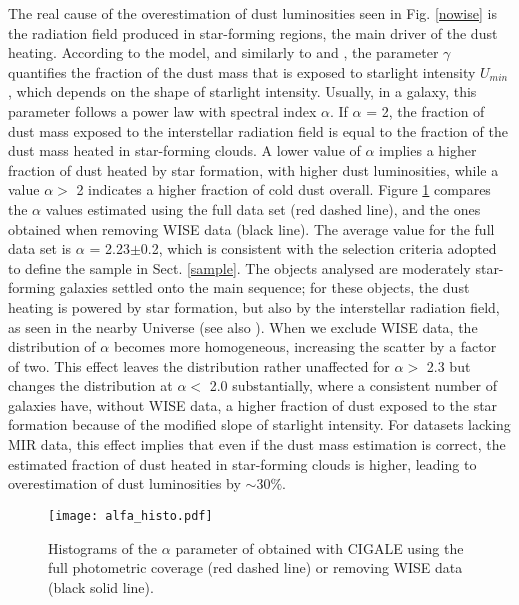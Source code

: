 \documentclass{aa}
\begin{document}
The real cause of the overestimation of dust luminosities  seen in Fig. \ref{nowise} is the radiation field produced in star-forming regions, the main driver of the dust heating. According to the \cite{dra} model, and similarly to \cite{dal} and \cite{dal2}, the parameter $\gamma$ quantifies the fraction of the dust mass that is exposed to starlight intensity $U_{min}$, which depends on the shape of starlight intensity. Usually, in a galaxy, this parameter follows a power law with spectral index $\alpha$. If $\alpha$ = 2, the fraction of dust mass exposed to the interstellar radiation field is equal to the fraction of the dust mass heated in star-forming clouds. A lower value of $\alpha$ implies a higher fraction of dust heated by star formation, with higher dust luminosities, while a value $\alpha >$ 2 indicates a higher fraction of cold dust overall. Figure \ref{alpha} compares the $\alpha$ values estimated using the full data set (red dashed line), and the ones obtained when removing WISE data (black line). The average value for the full data set is $\alpha$ = 2.23$\pm$0.2, which is consistent with the selection criteria adopted to define the sample in Sect. \ref{sample}. The objects analysed are moderately star-forming galaxies settled onto the main sequence; for these objects, the dust heating is powered by star formation, but also by the interstellar radiation field, as seen in the nearby Universe (see also \citealt{lon,ben,ben2,del,ben3,via2,via,boq}). When we exclude WISE data, the distribution of $\alpha$ becomes more homogeneous, increasing the scatter by a factor of two. This effect leaves the distribution rather unaffected for $\alpha >$ 2.3 but changes the distribution at $\alpha <$ 2.0  substantially, where a consistent number of galaxies have, without WISE data, a higher fraction of dust exposed to the star formation because of the modified slope of starlight intensity. For datasets lacking MIR data, this effect implies that even if the dust mass estimation is correct, the estimated fraction of dust heated in star-forming clouds is higher, leading to overestimation of dust luminosities by $\sim30\%$.

 \begin{figure}\begin{center}
 \texttt{[image: alfa\_histo.pdf]}
 \end{center} 
 \caption{Histograms of the $\alpha$ parameter of \cite{dra} obtained with CIGALE \citep{nol} using the full photometric coverage (red dashed line) or removing WISE data (black solid line).}\label{alpha}\end{figure}
\end{document}
